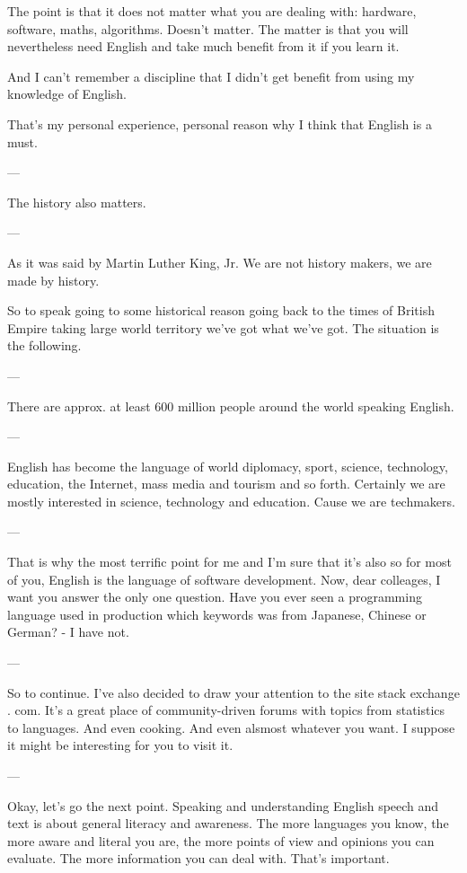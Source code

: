 \documentclass[a4paper, 14pt]{extarticle}
\begin{document}
The point is that it does not matter what you are dealing with: hardware,
software, maths, algorithms. Doesn't matter. The matter is that you will
nevertheless need English and take much benefit from it if you learn it.

And I can't remember a discipline that I didn't get benefit from using my
knowledge of English.

That's my personal experience, personal reason why I think that English is a
must.

---

The history also matters. 

---

As it was said by Martin Luther King, Jr. We are not
history makers, we are made by history.

So to speak going to some historical reason going back to the times of British
Empire taking large world territory we've got what we've got. The situation is
the following.

---

There are approx. at least 600 million people around the world speaking English.

--- 

English has become the language of world diplomacy, sport, science,
technology, education, the Internet, mass media and tourism and so forth.
Certainly we are mostly interested in science, technology and education. Cause
we are techmakers.

---

That is why the most terrific point for me and I'm sure that it's also so for
most of you, English is the language of software development. Now, dear
colleages, I want you answer the only one question. Have you ever seen a
programming language used in production which keywords was from Japanese,
Chinese or German? - I have not.

---

So to continue. I've also decided to draw your attention to the site stack
exchange . com. It's a great place of community-driven forums with topics from
statistics to languages.  And even cooking. And even alsmost whatever you want.
I suppose it might be interesting for you to visit it.  

---

Okay, let's go the next point. Speaking and understanding English speech and
text is about general literacy and awareness. The more languages you know, the
more aware and literal you are, the more points of view and opinions you can
evaluate. The more information you can deal with. That's important.
\end{document}

